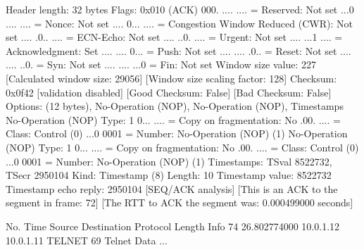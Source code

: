     Header length: 32 bytes
    Flags: 0x010 (ACK)
        000. .... .... = Reserved: Not set
        ...0 .... .... = Nonce: Not set
        .... 0... .... = Congestion Window Reduced (CWR): Not set
        .... .0.. .... = ECN-Echo: Not set
        .... ..0. .... = Urgent: Not set
        .... ...1 .... = Acknowledgment: Set
        .... .... 0... = Push: Not set
        .... .... .0.. = Reset: Not set
        .... .... ..0. = Syn: Not set
        .... .... ...0 = Fin: Not set
    Window size value: 227
    [Calculated window size: 29056]
    [Window size scaling factor: 128]
    Checksum: 0x0f42 [validation disabled]
        [Good Checksum: False]
        [Bad Checksum: False]
    Options: (12 bytes), No-Operation (NOP), No-Operation (NOP), Timestamps
        No-Operation (NOP)
            Type: 1
                0... .... = Copy on fragmentation: No
                .00. .... = Class: Control (0)
                ...0 0001 = Number: No-Operation (NOP) (1)
        No-Operation (NOP)
            Type: 1
                0... .... = Copy on fragmentation: No
                .00. .... = Class: Control (0)
                ...0 0001 = Number: No-Operation (NOP) (1)
        Timestamps: TSval 8522732, TSecr 2950104
            Kind: Timestamp (8)
            Length: 10
            Timestamp value: 8522732
            Timestamp echo reply: 2950104
    [SEQ/ACK analysis]
        [This is an ACK to the segment in frame: 72]
        [The RTT to ACK the segment was: 0.000499000 seconds]

No.     Time           Source                Destination           Protocol Length Info
     74 26.802774000   10.0.1.12             10.0.1.11             TELNET   69     Telnet Data ...

